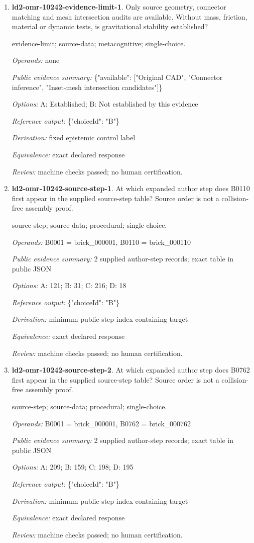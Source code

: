 \begin{enumerate}
\item \textbf{ld2-omr-10242-evidence-limit-1}. Only source geometry, connector matching and mesh intersection audits are available. Without mass, friction, material or dynamic tests, is gravitational stability established?
\par{\small evidence-limit; source-data; metacognitive; single-choice.\par\textit{Operands:} none\par\textit{Public evidence summary:} \{"available": ["Original CAD", "Connector inference", "Inset-mesh intersection candidates"]\}\par\textit{Options:} A: Established; B: Not established by this evidence\par\textit{Reference output:} \{"choiceId": "B"\}\par\textit{Derivation:} fixed epistemic control label\par\textit{Equivalence:} exact declared response\par\textit{Review:} machine checks passed; no human certification.}
\item \textbf{ld2-omr-10242-source-step-1}. At which expanded author step does B0110 first appear in the supplied source-step table? Source order is not a collision-free assembly proof.
\par{\small source-step; source-data; procedural; single-choice.\par\textit{Operands:} B0001 = brick\_000001, B0110 = brick\_000110\par\textit{Public evidence summary:} 2 supplied author-step records; exact table in public JSON\par\textit{Options:} A: 121; B: 31; C: 216; D: 18\par\textit{Reference output:} \{"choiceId": "B"\}\par\textit{Derivation:} minimum public step index containing target\par\textit{Equivalence:} exact declared response\par\textit{Review:} machine checks passed; no human certification.}
\item \textbf{ld2-omr-10242-source-step-2}. At which expanded author step does B0762 first appear in the supplied source-step table? Source order is not a collision-free assembly proof.
\par{\small source-step; source-data; procedural; single-choice.\par\textit{Operands:} B0001 = brick\_000001, B0762 = brick\_000762\par\textit{Public evidence summary:} 2 supplied author-step records; exact table in public JSON\par\textit{Options:} A: 209; B: 159; C: 198; D: 195\par\textit{Reference output:} \{"choiceId": "B"\}\par\textit{Derivation:} minimum public step index containing target\par\textit{Equivalence:} exact declared response\par\textit{Review:} machine checks passed; no human certification.}

\end{enumerate}
